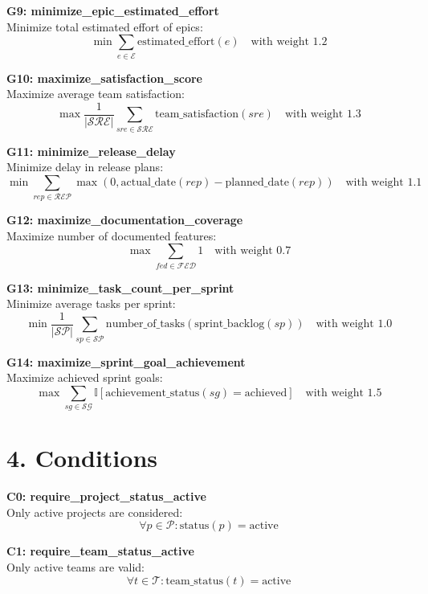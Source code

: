 \documentclass[12pt]{article}
\begin{document}
    \item \textbf{G9: minimize\_epic\_estimated\_effort} \\
    Minimize total estimated effort of epics:
    \[
    \min \sum_{e \in \mathcal{E}} \text{estimated\_effort}(e) \quad \text{with weight } 1.2
    \]

    \item \textbf{G10: maximize\_satisfaction\_score} \\
    Maximize average team satisfaction:
    \[
    \max \frac{1}{|\mathcal{SRE}|} \sum_{sre \in \mathcal{SRE}} \text{team\_satisfaction}(sre) \quad \text{with weight } 1.3
    \]

    \item \textbf{G11: minimize\_release\_delay} \\
    Minimize delay in release plans:
    \[
    \min \sum_{rep \in \mathcal{REP}} \max(0, \text{actual\_date}(rep) - \text{planned\_date}(rep)) \quad \text{with weight } 1.1
    \]

    \item \textbf{G12: maximize\_documentation\_coverage} \\
    Maximize number of documented features:
    \[
    \max \sum_{fed \in \mathcal{FED}} 1 \quad \text{with weight } 0.7
    \]

    \item \textbf{G13: minimize\_task\_count\_per\_sprint} \\
    Minimize average tasks per sprint:
    \[
    \min \frac{1}{|\mathcal{SP}|} \sum_{sp \in \mathcal{SP}} \text{number\_of\_tasks}(\text{sprint\_backlog}(sp)) \quad \text{with weight } 1.0
    \]

    \item \textbf{G14: maximize\_sprint\_goal\_achievement} \\
    Maximize achieved sprint goals:
    \[
    \max \sum_{sg \in \mathcal{SG}} \mathbb{I}[\text{achievement\_status}(sg) = \text{achieved}] \quad \text{with weight } 1.5
    \]

\section{4. Conditions}
\item \textbf{C0: require\_project\_status\_active} \\
    Only active projects are considered:
    \[
    \forall p \in \mathcal{P}: \text{status}(p) = \text{active}
    \]

    \item \textbf{C1: require\_team\_status\_active} \\
    Only active teams are valid:
    \[
    \forall t \in \mathcal{T}: \text{team\_status}(t) = \text{active}
    \]
\end{document}
